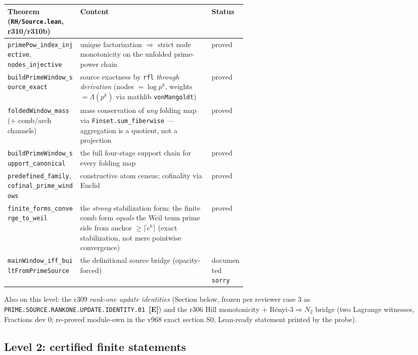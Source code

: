 \documentclass[11pt]{article}
\newcommand{\mE}{\textcolor{certgreen}{\textbf{[E]}}}
\theoremstyle{definition}
\theoremstyle{remark}
\begin{document}
\begin{center}\small
\begin{tabular}{@{}lp{0.55\linewidth}l@{}}
\toprule
\textbf{Theorem (\texttt{RH/Source.lean}, r310/r310b)} &
\textbf{Content} & \textbf{Status}\\
\midrule
\texttt{primePow\_index\_injective}, \texttt{nodes\_injective} &
unique factorization $\Rightarrow$ strict node monotonicity on the
unfolded prime-power chain & proved\\
\texttt{buildPrimeWindow\_source\_exact} & source exactness by
\texttt{rfl} \emph{through derivation} (nodes $= \log p^k$, weights
$= \Lambda(p^k)$ via mathlib \texttt{vonMangoldt}) & proved\\
\texttt{foldedWindow\_mass} (+ comb/arch channels) & mass
conservation of \emph{any} folding map via
\texttt{Finset.sum\_fiberwise} --- aggregation is a quotient, not a
projection & proved\\
\texttt{buildPrimeWindow\_support\_canonical} & the full four-stage
support chain for every folding map & proved\\
\texttt{predefined\_family}, \texttt{cofinal\_prime\_windows} &
constructive atom census; cofinality via Euclid & proved\\
\texttt{finite\_forms\_converge\_to\_weil} & the \emph{strong}
stabilization form: the finite comb form \emph{equals} the Weil
tsum prime side from anchor $\ge \lceil e^b \rceil$ (exact
stabilization, not mere pointwise convergence) & proved\\
\texttt{mainWindow\_iff\_builtFromPrimeSource} & the definitional
source bridge (opacity-forced) & documented \texttt{sorry}\\
\bottomrule
\end{tabular}
\end{center}

Also on this level: the r309 \emph{rank-one update identities}
(Section below, frozen per reviewer case 3 as
\texttt{PRIME.SOURCE.RANKONE.UPDATE.IDENTITY.01}~\mE) and the r306
Hill monotonicity $+$ R\'enyi-3${}\Rightarrow N_2$ bridge (two
Lagrange witnesses, Fractions dev 0; re-proved module-own in the
v968 exact section S0, Lean-ready statement printed by the probe).

\subsection{Level 2: certified finite statements}
\end{document}
